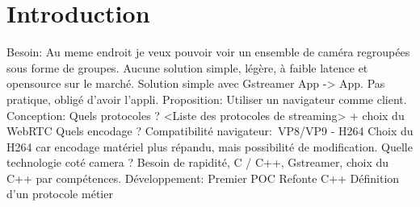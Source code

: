 \documentclass[12pt, a4paper]{report}
\begin{document}
\makeutbmfrontcover{}
\tableofcontents
\chapter{Introduction}
Besoin:\newline
    Au meme endroit je veux pouvoir voir un ensemble de caméra regroupées sous forme de groupes.\newline
    Aucune solution simple, légère, à faible latence et opensource sur le marché.\newline
    Solution simple avec Gstreamer App -> App. Pas pratique, obligé d'avoir l'appli.\newline
    Proposition: Utiliser un navigateur comme client.\newline\newline
Conception:\newline
    Quels protocoles ? <Liste des protocoles de streaming> + choix du WebRTC\newline
    Quels encodage ? Compatibilité navigateur: VP8/VP9 - H264\newline
    Choix du H264 car encodage matériel plus répandu, mais possibilité de modification.\newline
    Quelle technologie coté camera ? Besoin de rapidité, C / C++, Gstreamer, choix du C++ par compétences.\newline\newline
Développement:\newline
    Premier POC\newline
    Refonte C++\newline
    Définition d'un protocole métier\newline

\makeutbmbackcover{}
\end{document}
